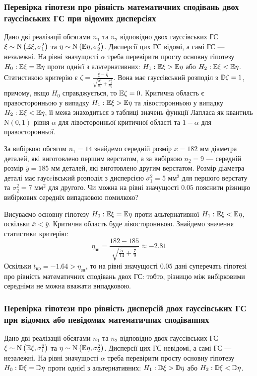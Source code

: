 \subsubsection*{Перевірка гіпотези про рівність математичних сподівань двох гауссівських 
ГС при відомих дисперсіях}
Дано дві реалізації обсягами $n_1$ та $n_2$ відповідно двох гауссівських ГС
$\xi \sim \mathrm{N}\left(\mathbb{E} \xi, \sigma_1^2\right)$ та $\eta \sim \mathrm{N}\left(\mathbb{E} \eta, \sigma_2^2\right)$.
Дисперсії цих ГС відомі, а самі ГС --- незалежні. На рівні значущості $\alpha$ треба перевірити
просту основну гіпотезу $H_0: \mathbb{E} \xi = \mathbb{E}\eta$ проти однієї з альтернативних:
$H_1 : \mathbb{E}\xi > \mathbb{E}\eta$ або $H_2 : \mathbb{E}\xi < \mathbb{E}\eta$. Статистикою критерію є
$\zeta = \frac{\overline{\xi} - \overline{\eta}}{\sqrt{\frac{\sigma_1^2}{n_1} + \frac{\sigma_2^2}{n_2}}}$. Вона має
гауссівський розподіл з $\mathbb{D}\zeta = 1$, причому, якщо $H_0$ справджується, то $\mathbb{E}\zeta = 0$.
Критична область є правосторонньою у випадку $H_1: \mathbb{E}\xi > \mathbb{E}\eta$ та лівосторонньою у випадку $H_2: \mathbb{E}\xi < \mathbb{E}\eta$,
її межа знаходиться з таблиці значень функції Лапласа як квантиль $\mathrm{N}(0, 1)$ рівня $\alpha$ для лівосторонньої
критичної області та $1-\alpha$ для правосторонньої.
\begin{example}
    За вибіркою обсягом $n_1 = 14$ знайдемо середній розмір $\overline{x} = 182$ мм діаметра деталей,
    які виготовлено першим верстатом, а за вибіркою $n_2 = 9$ --- середній розмір
    $\overline{y} = 185$ мм деталей, які виготовлено другим верстатом. Розмір діаметра деталі
    має гаусcівський розподіл з дисперсією $\sigma_1^2 = 5$ мм$^2$ для першого верстату
    та $\sigma_2^2 = 7$ мм$^2$ для другого. Чи можна на рівні значущості $0.05$ пояснити різницю вибіркових середніх
    випадковою помилкою?

    Висуваємо основну гіпотезу $H_0 : \mathbb{E} \xi = \mathbb{E}\eta$ проти альтернативної
    $H_1 : \mathbb{E}\xi < \mathbb{E}\eta$, оскільки $\overline{x} < \overline{y}$. Критична область буде лівосторонньою.
    Знайдемо значення статистики критерію:
    $$
    \eta_{\text{зн}} = \frac{182 - 185}{\sqrt{\frac{5}{14} + \frac{7}{9}}} \approx -2.81
    $$
    Оскільки $t_{\text{кр}} = -1.64 > \eta_{\text{зн}}$, то на рівні значущості $0.05$ дані суперечать гіпотезі
    про рівність математичних сподівань двох ГС: тобто, різницю між вибірковими середніми не можна вважати випадковою.
\end{example}

\subsubsection*{Перевірка гіпотези про рівність дисперсій двох гауссівських 
ГС при відомих або невідомих математичних сподіваннях}
Дано дві реалізації обсягами $n_1$ та $n_2$ відповідно двох гауссівських ГС
$\xi \sim \mathrm{N}\left(\mathbb{E} \xi, \sigma_1^2\right)$ та $\eta \sim \mathrm{N}\left(\mathbb{E} \eta, \sigma_2^2\right)$.
Дисперсії цих ГС невідомі, а самі ГС --- незалежні. На рівні значущості $\alpha$ треба перевірити
просту основну гіпотезу $H_0: \mathbb{D} \xi = \mathbb{D} \eta$ проти однієї з альтернативних:
$H_1 : \mathbb{D}\xi > \mathbb{D}\eta$ або $H_2 : \mathbb{D}\xi < \mathbb{D}\eta$. 

